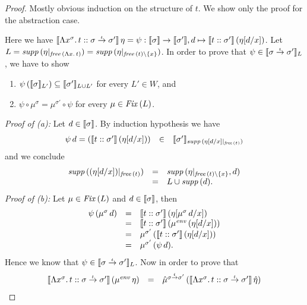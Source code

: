 \documentclass[12pt,a4paper]{report}
\newcommand{\senv}{\nstyle{env}}
\newcommand{\Fix}[1]{\nstyle{Fix}\,(#1)}
\begin{document}
\begin{proof}
  Mostly obvious induction on the structure of $t$. We show only the proof for the
  abstraction case.

  Here we have $\llbracket{\Lambda x^\sigma.\,t}\mathrel{::}{\sigma\stackrel{_t}{\to}\sigma'}\rrbracket\,\eta
    = \psi:\llbracket\sigma\rrbracket\to\llbracket\sigma'\rrbracket,
      d \mapsto \llbracket{t}\mathrel{::}{\sigma'}\rrbracket\,(\eta[d/x])$.
  Let $L = \mathit{supp}\,(\eta|_{\mathit{free}\,(\Lambda x.\,t)})
         = \mathit{supp}\,(\eta|_{\mathit{free}\,(t) \setminus \{x\}})$. In order to prove
  that $\psi \in \llbracket\sigma\stackrel{_t}{\to}\sigma'\rrbracket_L$, we have to show
  \begin{enumerate}
    \item[(a)] $\psi\,(\llbracket\sigma\rrbracket_{L'}) \subseteq \llbracket\sigma'\rrbracket_{L \cup L'}$ for every $L' \in W$, and
    \item[(b)] $\psi \circ \mu^\sigma = \mu^{\sigma'} \circ \psi$ for every $\mu\in\Fix{L}$.
  \end{enumerate}
  {\em Proof of (a):} Let $d \in \llbracket\sigma\rrbracket$. By induction hypothesis we have
  \[\begin{array}{rcl}
    \psi\,d = (\llbracket{t}\mathrel{::}{\sigma'}\rrbracket\,(\eta[d/x]))
    &\in& \llbracket\sigma'\rrbracket_{\mathit{supp}\,(\eta[d/x]|_{\mathit{free}\,(t)})}
  \end{array}\]
  and we conclude
  \[\begin{array}{rcl}
    \mathit{supp}\,((\eta[d/x])|_{\mathit{free}\,(t)})
    &=& \mathit{supp}\,(\eta|_{\mathit{free}\,(t)\setminus\{x\}},d) \\
    &=& L \cup \mathit{supp}\,(d).
  \end{array}\]
   {\em Proof of (b):} Let $\mu\in\Fix{L}$ and $d\in\llbracket\sigma\rrbracket$, then
   \[\begin{array}{rcl}
    \psi\,(\mu^\sigma\,d)
    &=& \semantic{\tj{t}{\sigma'}}\,(\eta[\mu^\sigma\,d/x]) \\
    &=& \semantic{\tj{t}{\sigma'}}\,(\mu^\senv\,(\eta[d/x])) \\
    &=& \mu^{\sigma'}\,(\semantic{\tj{t}{\sigma'}}\,(\eta[d/x])) \\
    &=& \mu^{\sigma'}\,(\psi\,d).
  \end{array}\]
  Hence we know that $\psi \in \llbracket\sigma\stackrel{_t}{\to}\sigma'\rrbracket_L$. Now in order to prove that
  \[\begin{array}{rcl}
    \semantic{\tj{\tabstr{x^\sigma}{t}}{\ttarrow{\sigma}{\sigma'}}}\,(\mu^\senv\,\eta)
    &=& \hat{\mu}^{\ttarrow{\sigma}{\sigma'}}\,
      (\semantic{\tj{\tabstr{x^\sigma}{t}}{\ttarrow{\sigma}{\sigma'}}}\,\hat{\eta})
  \end{array}\]

\end{proof}
\end{document}
